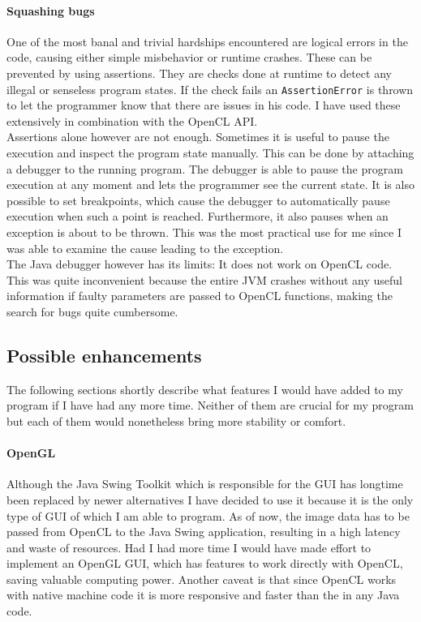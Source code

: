 \documentclass[10pt,a4paper,titlepage]{article}
\begin{document}
	\paragraph{Squashing bugs}
	One of the most banal and trivial hardships encountered are logical errors in the code, causing either simple misbehavior or runtime crashes. These can be prevented by using assertions. They are checks done at runtime to detect any illegal or senseless program states. If the check fails an \verb|AssertionError| is thrown to let the programmer know that there are issues in his code. I have used these extensively in combination with the OpenCL API.\\
	Assertions alone however are not enough. Sometimes it is useful to pause the execution and inspect the program state manually. This can be done by attaching a debugger to the running program. The debugger is able to pause the program execution at any moment and lets the programmer see the current state. It is also possible to set breakpoints, which cause the debugger to automatically pause execution when such a point is reached. Furthermore, it also pauses when an exception is about to be thrown. This was the most practical use for me since I was able to examine the cause leading to the exception.\\
	The Java debugger however has its limits: It does not work on OpenCL code. This was quite inconvenient because the entire JVM crashes without any useful information if faulty parameters are passed to OpenCL functions, making the search for bugs quite cumbersome.
	\subsection{Possible enhancements}\label{sec:poss_enh}
	The following sections shortly describe what features I would have added to my program if I have had any more time. Neither of them are crucial for my program but each of them would nonetheless bring more stability or comfort.
	\paragraph{OpenGL}
	Although the Java Swing Toolkit which is responsible for the GUI has longtime been replaced by newer alternatives I have decided to use it because it is the only type of GUI of which I am able to program. As of now, the image data has to be passed from OpenCL to the Java Swing application, resulting in a high latency and waste of resources. Had I had more time I would have made effort to implement an OpenGL GUI, which has features to work directly with OpenCL, saving valuable computing power. Another caveat is that since OpenCL works with native machine code it is more responsive and faster than the in any Java code.
\end{document}

